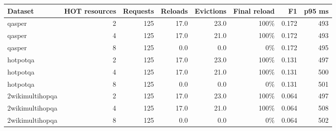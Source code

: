 \begin{tabular}{lrrrrrrr}
\toprule
Dataset & HOT resources & Requests & Reloads & Evictions & Final reload & F1 & p95 ms \\
\midrule
qasper & 2 & 125 & 17.0 & 23.0 & 100\% & 0.172 & 493 \\
qasper & 4 & 125 & 17.0 & 21.0 & 100\% & 0.172 & 493 \\
qasper & 8 & 125 & 0.0 & 0.0 & 0\% & 0.172 & 495 \\
hotpotqa & 2 & 125 & 17.0 & 23.0 & 100\% & 0.131 & 497 \\
hotpotqa & 4 & 125 & 17.0 & 21.0 & 100\% & 0.131 & 500 \\
hotpotqa & 8 & 125 & 0.0 & 0.0 & 0\% & 0.131 & 501 \\
2wikimultihopqa & 2 & 125 & 17.0 & 23.0 & 100\% & 0.064 & 497 \\
2wikimultihopqa & 4 & 125 & 17.0 & 21.0 & 100\% & 0.064 & 508 \\
2wikimultihopqa & 8 & 125 & 0.0 & 0.0 & 0\% & 0.064 & 502 \\
\bottomrule
\end{tabular}

